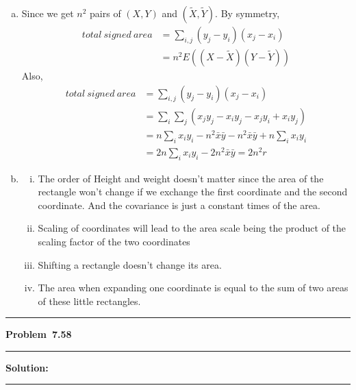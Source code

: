\documentclass[10.5pt]{article}
\newcommand\question[1]{\vspace{.2in}\hrule\vspace{0.04in}\textbf{Problem\ #1}\vspace{.4em}\hrule\vspace{.10in}}
\newcommand\Solution{\vspace{.3in}\textbf{Solution:}\vspace{.5em}\hrule\vspace{.08in}\par}
\begin{document}
\begin{enumerate}[(a)]
	\item Since we get $n^2$ pairs of $(X, Y)$ and $(\widetilde{X}, \widetilde{Y})$. By symmetry, \begin{align*}
		total\ signed\ area &= \sum_{i, j}(y_j-y_i)(x_j-x_i)\\[6pt]
		&=n^2E((X-\widetilde{X})(Y-\widetilde{Y}))
	\end{align*}
	Also, \begin{align*}
		total\ signed\ area &= \sum_{i, j}(y_j-y_i)(x_j-x_i)\\[6pt]
		&= \sum_{i}\sum_j(x_jy_j - x_iy_j-x_jy_i+x_iy_j)\\[6pt]
		&=n\sum_ix_iy_i-n^2\bar{x}\bar{y}-n^2\bar{x}\bar{y}+n\sum_ix_iy_i\\[6pt]
		&= 2n\sum_ix_iy_i - 2n^2\bar{x}\bar{y} = 2n^2r
	\end{align*}\vspace{1.5cm}
	\item \begin{enumerate}[(i)]
		\item The order of Height and weight doesn't matter since the area of the rectangle won't change if we exchange the first coordinate and the second coordinate. And the covariance is just a constant times of the area.
		\item Scaling of coordinates will lead to the area scale being the product of the scaling factor of the two coordinates
		\item Shifting a rectangle doesn't change its area.
		\item The area when expanding one coordinate is equal to the sum of two areas of these little rectangles.
	\end{enumerate}
\end{enumerate}
\pagebreak
\question{7.58}
\Solution{}
\end{document}

